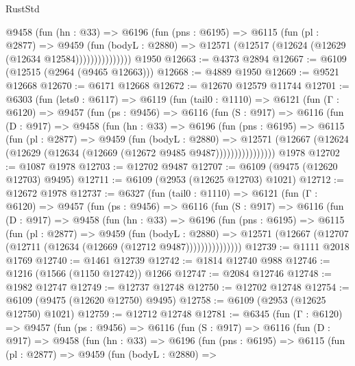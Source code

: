 \begin{lexlean}{RustStd}
\begin{coremodule}
                @9458
                  (fun (hn : @33) =>
                  @6196
                    (fun (pns : @6195) =>
                    @6115
                      (fun (pl : @2877) =>
                      @9459
                        (fun (bodyL : @2880) =>
                        @12571 (@12517 (@12624 (@12629 (@12634 @12584)))))))))))))))
    @1950
@12663 := @4373 @2894
@12667 := @6109 (@12515 (@2964 (@9465 @12663)))
@12668 := @4889 @1950
@12669 := @9521 @12668
@12670 := @6171 @12668
@12672 := @12670 @12579 @11744
@12701 := @6303
    (fun (lets0 : @6117) =>
    @6119
      (fun (tail0 : @1110) =>
      @6121
        (fun (Γ : @6120) =>
        @9457
          (fun (ps : @9456) =>
          @6116
            (fun (S : @917) =>
            @6116
              (fun (D : @917) =>
              @9458
                (fun (hn : @33) =>
                @6196
                  (fun (pns : @6195) =>
                  @6115
                    (fun (pl : @2877) =>
                    @9459
                      (fun (bodyL : @2880) =>
                      @12571
                        (@12667 (@12624 (@12629 (@12634 (@12669 (@12672 @9485 @9487))))))))))))))))
    @1978
@12702 := @1087 @1978
@12703 := @12702 @9487
@12707 := @6109 (@9475 (@12620 @12703) @9495)
@12711 := @6109 (@2953 (@12625 @12703) @1021)
@12712 := @12672 @1978
@12737 := @6327
    (fun (tail0 : @1110) =>
    @6121
      (fun (Γ : @6120) =>
      @9457
        (fun (ps : @9456) =>
        @6116
          (fun (S : @917) =>
          @6116
            (fun (D : @917) =>
            @9458
              (fun (hn : @33) =>
              @6196
                (fun (pns : @6195) =>
                @6115
                  (fun (pl : @2877) =>
                  @9459
                    (fun (bodyL : @2880) =>
                    @12571 (@12667 (@12707 (@12711 (@12634 (@12669 (@12712 @9487)))))))))))))))
@12739 := @1111 @2018 @1769
@12740 := @1461 @12739
@12742 := @1814 @12740 @988
@12746 := @1216 (@1566 (@1150 @12742)) @1266
@12747 := @2084 @12746
@12748 := @1982 @12747
@12749 := @12737 @12748
@12750 := @12702 @12748
@12754 := @6109 (@9475 (@12620 @12750) @9495)
@12758 := @6109 (@2953 (@12625 @12750) @1021)
@12759 := @12712 @12748
@12781 := @6345
    (fun (Γ : @6120) =>
    @9457
      (fun (ps : @9456) =>
      @6116
        (fun (S : @917) =>
        @6116
          (fun (D : @917) =>
          @9458
            (fun (hn : @33) =>
            @6196
              (fun (pns : @6195) =>
              @6115
                (fun (pl : @2877) =>
                @9459
                  (fun (bodyL : @2880) =>

\end{coremodule}
\end{lexlean}
